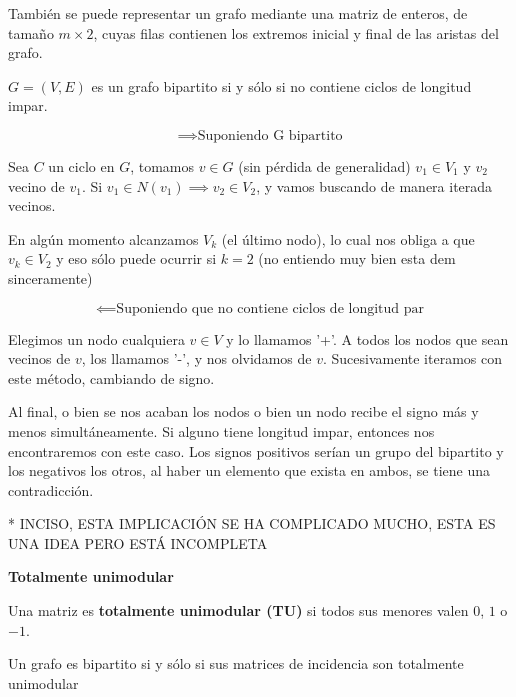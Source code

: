 \documentclass[openany]{book}
\begin{document}
También se puede representar un grafo mediante una matriz de enteros, de tamaño $m \times 2$, cuyas filas contienen los extremos inicial y final de las aristas del grafo.

\begin{proposition}
  $G=(V,E)$ es un grafo bipartito si y sólo si no contiene ciclos de longitud impar.
\end{proposition}

\begin{demonstration}
  $$ \implies \text{Suponiendo G bipartito} $$

  Sea $C$ un ciclo en $G$, tomamos $v \in G$ (sin pérdida de generalidad) $v_1 \in V_1$ y $v_2$ vecino de $v_1$. Si $v_1 \in N(v_1) \implies v_2 \in V_2$, y vamos buscando de manera iterada vecinos.

  En algún momento alcanzamos $V_k$ (el último nodo), lo cual nos obliga a que $v_k \in V_2$ y eso sólo puede ocurrir si $k=2$ (no entiendo muy bien esta dem sinceramente)

  $$ \impliedby \text{Suponiendo que no contiene ciclos de longitud par} $$

  Elegimos un nodo cualquiera $v \in V$ y lo llamamos '+'. A todos los nodos que sean vecinos de $v$, los llamamos '-', y nos olvidamos de $v$. Sucesivamente iteramos con este método, cambiando de signo.

  Al final, o bien se nos acaban los nodos o bien un nodo recibe el signo más y menos simultáneamente. Si alguno tiene longitud impar, entonces nos encontraremos con este caso. Los signos positivos serían un grupo del bipartito y los negativos los otros, al haber un elemento que exista en ambos, se tiene una contradicción.

* INCISO, ESTA IMPLICACIÓN SE HA COMPLICADO MUCHO, ESTA ES UNA IDEA PERO ESTÁ INCOMPLETA

\end{demonstration}

\begin{definition}
  { \color{turquoise} \textbf{Totalmente unimodular}}

  Una matriz es \textbf{totalmente unimodular (TU)} si todos sus menores valen $0$, $1$ o $-1$.
\end{definition}

\begin{proposition}
  Un grafo es bipartito si y sólo si sus matrices de incidencia son totalmente unimodular
\end{proposition}
\end{document}
